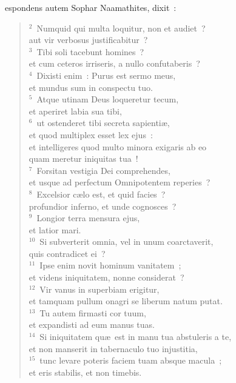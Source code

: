 \bchapter
{}espondens autem Sophar Naamathites, dixit~:
\begin{flushleft}\begin{verse}\vspace{6pt}${}^{2}$~Numquid qui multa loquitur, non et audiet~?\\ aut vir verbosus justificabitur~?\\
${}^{3}$~Tibi soli tacebunt homines~?\\ et cum ceteros irriseris, a nullo confutaberis~?\\
${}^{4}$~Dixisti enim~: Purus est sermo meus,\\ et mundus sum in conspectu tuo.\\
${}^{5}$~Atque utinam Deus loqueretur tecum,\\ et aperiret labia sua tibi,\\
${}^{6}$~ut ostenderet tibi secreta sapienti\ae ,\\ et quod multiplex esset lex ejus~:\\ et intelligeres quod multo minora exigaris ab eo\\ quam meretur iniquitas tua~!\\
${}^{7}$~Forsitan vestigia Dei comprehendes,\\ et usque ad perfectum Omnipotentem reperies~?\\
${}^{8}$~Excelsior c\ae lo est, et quid facies~?\\ profundior inferno, et unde cognosces~?\\
${}^{9}$~Longior terra mensura ejus,\\ et latior mari.\\
${}^{10}$~Si subverterit omnia, vel in unum coarctaverit,\\ quis contradicet ei~?\\
${}^{11}$~Ipse enim novit hominum vanitatem~;\\ et videns iniquitatem, nonne considerat~?\\
${}^{12}$~Vir vanus in superbiam erigitur,\\ et tamquam pullum onagri se liberum natum putat.\\
${}^{13}$~Tu autem firmasti cor tuum,\\ et expandisti ad eum manus tuas.\\
${}^{14}$~Si iniquitatem qu\ae\ est in manu tua abstuleris a te,\\ et non manserit in tabernaculo tuo injustitia,\\
${}^{15}$~tunc levare poteris faciem tuam absque macula~;\\ et eris stabilis, et non timebis.\\

\end{verse}
\end{flushleft}
